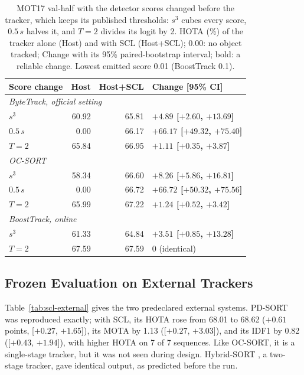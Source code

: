 \begin{table}[tbp]
\centering
\caption{MOT17 val-half with the detector scores changed before the tracker, which keeps its published thresholds: $s^3$ cubes every score, $0.5\,s$ halves it, and $T=2$ divides its logit by 2. HOTA (\%) of the tracker alone (Host) and with SCL (Host+SCL); 0.00: no object tracked; Change with its 95\% paired-bootstrap interval; bold: a reliable change. Lowest emitted score 0.01 (BoostTrack 0.1).}
\label{tab:scl-shift}
\begin{tabular}{lrrl}
\toprule
Score change & Host & Host+SCL & Change [95\% CI]\\
\midrule
\multicolumn{4}{l}{\textit{ByteTrack, official setting} \cite{zhang2022bytetrack}}\\
\quad $s^3$ & 60.92 & 65.81 & \textbf{$+4.89$ [$+2.60$, $+13.69$]}\\
\quad $0.5\,s$ & 0.00 & 66.17 & \textbf{$+66.17$ [$+49.32$, $+75.40$]}\\
\quad $T=2$ & 65.84 & 66.95 & \textbf{$+1.11$ [$+0.35$, $+3.87$]}\\
\multicolumn{4}{l}{\textit{OC-SORT} \cite{cao2023ocsort}}\\
\quad $s^3$ & 58.34 & 66.60 & \textbf{$+8.26$ [$+5.86$, $+16.81$]}\\
\quad $0.5\,s$ & 0.00 & 66.72 & \textbf{$+66.72$ [$+50.32$, $+75.56$]}\\
\quad $T=2$ & 65.99 & 67.22 & \textbf{$+1.24$ [$+0.52$, $+3.42$]}\\
\multicolumn{4}{l}{\textit{BoostTrack, online} \cite{stanojevic2024boosttrack}}\\
\quad $s^3$ & 61.33 & 64.84 & \textbf{$+3.51$ [$+0.85$, $+13.28$]}\\
\quad $T=2$ & 67.59 & 67.59 & 0 (identical)\\
\bottomrule
\end{tabular}
\end{table}

\subsection{Frozen Evaluation on External Trackers}\label{sec:scl-res-external}
Table~\ref{tab:scl-external} gives the two predeclared external systems. PD-SORT \cite{wang2025pdsort} was reproduced exactly; with SCL, its HOTA rose from 68.01 to 68.62 ($+0.61$ points, [$+0.27$, $+1.65$]), its MOTA by 1.13 ([$+0.27$, $+3.03$]), and its IDF1 by 0.82 ([$+0.43$, $+1.94$]), with higher HOTA on 7 of 7 sequences. Like OC-SORT, it is a single-stage tracker, but it was not seen during design. Hybrid-SORT \cite{yang2024hybridsort}, a two-stage tracker, gave identical output, as predicted before the run.

